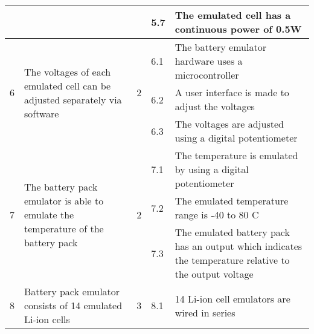 \begin{longtable}{|l|p{2in}|p{0.8in}|l|p{2in}|}
                        &                                                                                                                                       &                             & 5.7  & The emulated cell has a continuous power of 0.5W                                                          \\ \hline
    \multirow{3}{*}{6}  & \multirow{3}{*}{The voltages of each emulated cell can be adjusted separately via software}                                           & \multirow{3}{*}{2}          & 6.1  & The battery emulator hardware uses a microcontroller                                                      \\ \cline{4-5} 
                        &                                                                                                                                       &                             & 6.2  & A user interface is made to adjust the voltages                                                           \\ \cline{4-5} 
                        &                                                                                                                                       &                             & 6.3  & The voltages are adjusted using a digital potentiometer                                                   \\ \hline
    \multirow{3}{*}{7}  & \multirow{3}{*}{The battery pack emulator is able to emulate the temperature of the battery pack}                                     & \multirow{3}{*}{2}          & 7.1  & The temperature is emulated by using a digital potentiometer                                              \\ \cline{4-5} 
                        &                                                                                                                                       &                             & 7.2  & The emulated temperature range is -40 to 80 C                                                             \\ \cline{4-5} 
                        &                                                                                                                                       &                             & 7.3  & The emulated battery pack has an output which indicates the temperature relative to the output voltage    \\ \hline
    8                   & Battery pack emulator consists of 14 emulated Li-ion cells                                                                            & 3                           & 8.1  & 14 Li-ion cell emulators are wired in series                                                              \\ \hline

\end{longtable}
